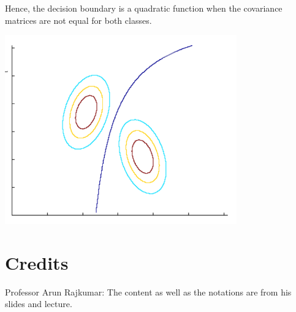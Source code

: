 \documentclass[
]{article}
\begin{document}
\begin{enumerate}
Hence, the decision boundary is a quadratic function when the covariance
matrices are not equal for both classes.

\includegraphics[width=10cm]{../images/non-equal_var.png}

\end{enumerate}

\hypertarget{credits}{%
\section{Credits}\label{credits}}

Professor Arun Rajkumar: The content as well as the notations are from
his slides and lecture.
\end{document}

